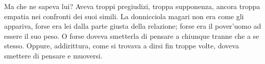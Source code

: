 Ma che ne sapeva lui? Aveva troppi pregiudizi, troppa supponenza, ancora troppa empatia nei confronti dei suoi simili. La donnicciola magari non era come gli appariva, forse era lei dalla parte giusta della relazione; forse era il pover'uomo ad essere il suo peso. O forse doveva smetterla di pensare a chiunque tranne che a se stesso. Oppure, addirittura, come si trovava a dirsi fin troppe volte, doveva smettere di pensare e muoversi.
